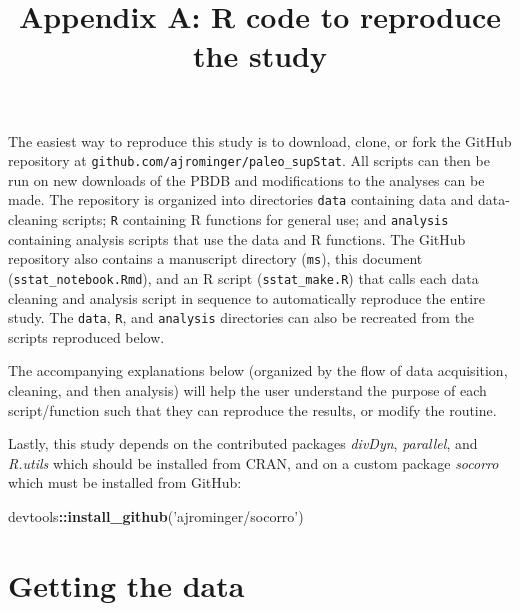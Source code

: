 \documentclass[]{article}
\title{Appendix A: R code to reproduce the study}
\author{}
\date{}
\newenvironment{Shaded}{\begin{snugshade}}{\end{snugshade}}
\newcommand{\KeywordTok}[1]{\textcolor[rgb]{0.13,0.29,0.53}{\textbf{#1}}}
\newcommand{\StringTok}[1]{\textcolor[rgb]{0.31,0.60,0.02}{#1}}
\newcommand{\OperatorTok}[1]{\textcolor[rgb]{0.81,0.36,0.00}{\textbf{#1}}}
\newcommand{\NormalTok}[1]{#1}
\begin{document}
\maketitle

\newcommand{\beginappendix}{%
  \setcounter{table}{0}
  \renewcommand{\thetable}{A\arabic{table}}%
  \setcounter{figure}{0}
  \renewcommand{\thefigure}{A\arabic{figure}}%
  \setcounter{section}{0}
  \renewcommand{\thesection}{A\arabic{section}}%
}

\beginappendix

The easiest way to reproduce this study is to download, clone, or fork
the GitHub repository at \texttt{github.com/ajrominger/paleo\_supStat}.
All scripts can then be run on new downloads of the PBDB and
modifications to the analyses can be made. The repository is organized
into directories \texttt{data} containing data and data-cleaning
scripts; \texttt{R} containing R functions for general use; and
\texttt{analysis} containing analysis scripts that use the data and R
functions. The GitHub repository also contains a manuscript directory
(\texttt{ms}), this document (\texttt{sstat\_notebook.Rmd}), and an R
script (\texttt{sstat\_make.R}) that calls each data cleaning and
analysis script in sequence to automatically reproduce the entire study.
The \texttt{data}, \texttt{R}, and \texttt{analysis} directories can
also be recreated from the scripts reproduced below.

The accompanying explanations below (organized by the flow of data
acquisition, cleaning, and then analysis) will help the user understand
the purpose of each script/function such that they can reproduce the
results, or modify the routine.

Lastly, this study depends on the contributed packages \emph{divDyn},
\emph{parallel}, and \emph{R.utils} which should be installed from CRAN,
and on a custom package \emph{socorro} which must be installed from
GitHub:

\begin{Shaded}
\begin{Highlighting}[]
\NormalTok{devtools}\OperatorTok{::}\KeywordTok{install_github}\NormalTok{(}\StringTok{'ajrominger/socorro'}\NormalTok{)}
\end{Highlighting}
\end{Shaded}

\section{Getting the data}\label{getting-the-data}
\end{document}
